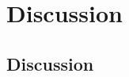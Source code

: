 \documentclass[10pt]{beamer}
\begin{document}
%
% 
%
%
% 
%
%
%
%


\section{Discussion}
\subsection{Discussion}
\end{document}

